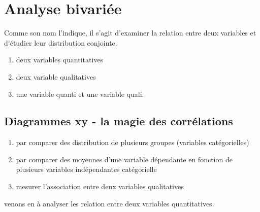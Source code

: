 \documentclass[
]{book}
\newenvironment{Shaded}{\begin{snugshade}}{\end{snugshade}}
\newcommand{\DataTypeTok}[1]{\textcolor[rgb]{0.13,0.29,0.53}{#1}}
\newcommand{\FloatTok}[1]{\textcolor[rgb]{0.00,0.00,0.81}{#1}}
\newcommand{\KeywordTok}[1]{\textcolor[rgb]{0.13,0.29,0.53}{\textbf{#1}}}
\newcommand{\NormalTok}[1]{#1}
\newcommand{\OperatorTok}[1]{\textcolor[rgb]{0.81,0.36,0.00}{\textbf{#1}}}
\newcommand{\StringTok}[1]{\textcolor[rgb]{0.31,0.60,0.02}{#1}}
\providecommand{\tightlist}{%
  \setlength{\itemsep}{0pt}\setlength{\parskip}{0pt}}
\begin{document}
\hypertarget{analyse-bivariuxe9e}{%
\section{Analyse bivariée}\label{analyse-bivariuxe9e}}

Comme son nom l'indique, il s'agit d'examiner la relation entre deux variables et d'étudier leur distribution conjointe.

\begin{enumerate}
\def\labelenumi{\alph{enumi})}
\tightlist
\item
  deux variables quantitatives
\item
  deux variable qualitatives
\item
  une variable quanti et une variable quali.
\end{enumerate}

\hypertarget{diagrammes-xy---la-magie-des-corruxe9lations}{%
\subsection{Diagrammes xy - la magie des corrélations}\label{diagrammes-xy---la-magie-des-corruxe9lations}}

\begin{enumerate}
\def\labelenumi{\alph{enumi})}
\tightlist
\item
  par comparer des distribution de plusieurs groupes (variables catégorielles)
\item
  par comparer des moyennes d'une variable dépendante en fonction de plusieurs variables indépendantes catégorielle
\item
  mesurer l'association entre deux variables qualitatives
\end{enumerate}

venons en à analyser les relation entre deux variables quantitatives.

\begin{Shaded}
\end{Shaded}
\end{document}
